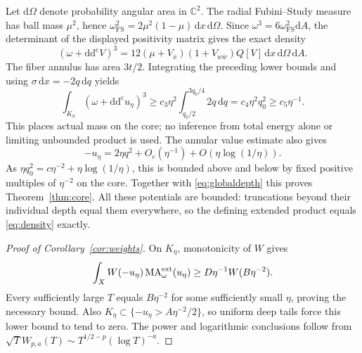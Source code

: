 \documentclass[11pt]{article}
\theoremstyle{remark}
\newcommand{\ddc}{\mathrm{d}\mathrm{d}^{\mathrm c}}
\newcommand{\C}{\mathbb C}
\newcommand{\FS}{\mathrm{FS}}
\newcommand{\MA}{\operatorname{MA}}
\begin{document}
Let $\mathrm d\Omega$ denote probability angular area in $\C^2$.
The radial Fubini--Study measure has ball mass $\mu^2$, hence
$\omega_{\FS}^2=2\mu^2(1-\mu)\,\mathrm dx\,\mathrm d\Omega$.
Since $\omega^3=6\omega_{\FS}^2\mathrm dA$, the determinant of the displayed
positivity matrix gives the exact density
\begin{equation}\label{eq:density}
 (\omega+\ddc V)^3
 =12(\mu+V_x)(1+V_{w\bar w})Q[V]\,
           \mathrm dx\,\mathrm d\Omega\,\mathrm dA.
\end{equation}
The fiber annulus has area $3t/2$.
Integrating the preceding lower bounds and using
$\sigma\,\mathrm dx=-2q\,\mathrm dq$ yields
\[
 \int_{K_\eta}(\omega+\ddc u_\eta)^3
 \geq c_3\eta^2\int_{q_0/2}^{3q_0/4}2q\,\mathrm dq
 =c_4\eta^2q_0^2\geq c_5\eta^{-1}.
\]
This places actual mass on the core; no inference from total energy alone
or limiting unbounded product is used.
The annular value estimate also gives
\[
 -u_\eta=2\eta q^2+O_c(\eta^{-1})+O(\eta\log(1/\eta)).
\]
As $\eta q_0^2=c\eta^{-2}+\eta\log(1/\eta)$, this is bounded above and below
by fixed positive multiples of $\eta^{-2}$ on the core.
Together with \eqref{eq:globaldepth} this proves Theorem~\ref{thm:core}.
All these potentials are bounded: truncations beyond their individual depth
equal them everywhere, so the defining extended product equals
\eqref{eq:density} exactly.

\begin{proof}[Proof of Corollary~\ref{cor:weights}]
On $K_\eta$, monotonicity of $W$ gives
\[
 \int_XW(-u_\eta)\MA^{\rm ext}_\omega(u_\eta)
       \geq D\eta^{-1}W(B\eta^{-2}).
\]
Every sufficiently large $T$ equals $B\eta^{-2}$ for some sufficiently small
$\eta$, proving the necessary bound.
Also $K_\eta\subset\{-u_\eta>A\eta^{-2}/2\}$, so uniform deep tails force
this lower bound to tend to zero. The power and logarithmic conclusions
follow from $\sqrt T W_{p,a}(T)\sim T^{1/2-p}(\log T)^{-a}$.
\end{proof}
\end{document}
